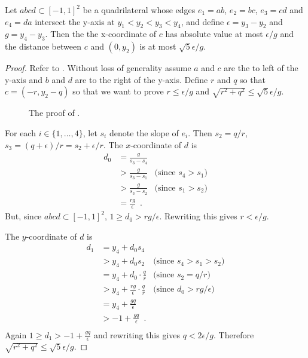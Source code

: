\documentclass{patmorin}
\begin{document}
\begin{lem}
  Let $abcd\subset[-1,1]^2$ be a quadrilateral whose edges
  $e_1=ab$, $e_2=bc$, $e_3=cd$ and $e_4=da$ intersect the y-axis at
  $y_1<y_2<y_3<y_4$, and define $\epsilon=y_3-y_2$ and $g=y_4-y_3$.  Then
  the the x-coordinate of $c$ has absolute value at most $\epsilon/g$ and
  the distance between $c$ and $(0,y_2)$ is at most $\sqrt{5}\epsilon/g$.
\end{lem}

\begin{proof}
  Refer to .  Without loss of generality assume
  $a$ and $c$ are the to left of the y-axis and $b$ and $d$ are to
  the right of the y-axis.  Define $r$ and $q$ so that $c=(-r,y_2-q)$
  so that we want to prove $r\le\epsilon/g$ and $\sqrt{r^2+q^2}\le
  \sqrt{5}\epsilon/g$.

  \begin{figure}
     \caption{The proof of .}
  \end{figure}

  For each $i\in\{1,\ldots,4\}$, let $s_i$ denote the slope of $e_i$.
  Then $s_2=q/r$, $s_3=(q+\epsilon)/r=s_2+\epsilon/r$.
  The $x$-coordinate of $d$ is
  \begin{align*}
      d_0 & = \frac{g}{s_3-s_4} \\ 
          & > \frac{g}{s_3-s_1} & \text{(since $s_4 > s_1$)} \\
          & > \frac{g}{s_3-s_2} & \text{(since $s_1 > s_2$)}\\
          & = \frac{rg}{\epsilon} \enspace .
  \end{align*}
  But, since $abcd\subset[-1,1]^2$,  $1\ge d_0> rg/\epsilon$.
  Rewriting this gives $r < \epsilon/g$.

  The $y$-coordinate of $d$ is
  \begin{align*}
     d_1 & = y_4 + d_0 s_4 \\
     & > y_4 + d_0 s_2 & \text{(since $s_4>s_1>s_2$)} \\
     & = y_4 + d_0 \cdot\frac{q}{r} & \text{(since $s_2=q/r$)} \\
     & > y_4 + \frac{rg}{\epsilon}\cdot\frac{q}{r} & \text{(since $d_0>rg/\epsilon$)} \\
     & = y_4 + \frac{gq}{\epsilon} \\
     & > -1 + \frac{gq}{\epsilon} \enspace. \\
  \end{align*}
  Again $1\ge d_1 > -1 + \frac{gq}{\epsilon}$ and rewriting this gives
  $q < 2\epsilon/g$.  Therefore $\sqrt{r^2+q^2} \le \sqrt{5}\epsilon/g$.
\end{proof}
\end{document}
